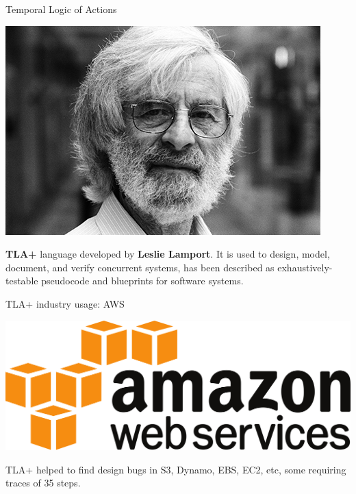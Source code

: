 \documentclass[12pt]{beamer}
\begin{document}
  \begin{frame}{Temporal Logic of Actions}
      \begin{center}
          \includegraphics[scale=0.3]{figures/lamport.jpg}
      \end{center}
      \textbf{TLA+} language developed by \textbf{Leslie Lamport}. It is
      used to design, model, document, and verify concurrent systems, has
      been described as exhaustively-testable pseudocode and blueprints
      for software systems.
  \end{frame}
  \begin{frame}{TLA+ industry usage: AWS}
    \begin{center}
       \includegraphics[scale=0.08]{figures/aws}
    \end{center}
     TLA+ helped to find design bugs in S3, Dynamo, EBS, EC2, etc, some
     requiring traces of 35 steps.~\cite{aws2014}
  \end{frame}
\end{document}

